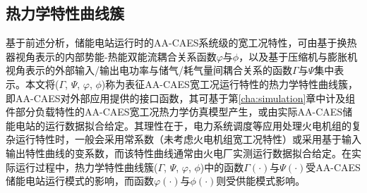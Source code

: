 \subsection{热力学特性曲线簇}
基于前述分析，储能电站运行时的AA-CAES系统级的宽工况特性，可由基于换热器视角表示的内部势能-热能双能流耦合关系函数$\varphi$与$\phi$，以及基于压缩机与膨胀机视角表示的外部输入/输出电功率与储气/耗气量间耦合关系的函数$\Gamma $与$\Psi$集中表示。本文将($\Gamma$, $\Psi$, $\varphi$, $\phi$)称为表征AA-CAES宽工况运行特性的热力学特性曲线簇，即AA-CAES对外部应用提供的接口函数，其可基于第\ref{cha:simulation}章中计及组件部分负载特性的AA-CAES宽工况热力学仿真模型产生，或由实际AA-CAES储能电站的运行数据拟合给定。其理性在于，电力系统调度等应用处理火电机组的复杂运行特性时，一般会采用常系数（未考虑火电机组宽工况特性）或采用基于输入输出特性曲线的变系数，而该特性曲线通常由火电厂实测运行数据拟合给定。在实际运行过程中，热力学特性曲线簇($\Gamma$, $\Psi$, $\varphi$, $\phi$)中的函数$\Gamma(\cdot)$与$\Psi(\cdot)$受AA-CAES储能电站运行模式的影响，而函数$\varphi(\cdot)$与$\phi(\cdot)$则受供能模式影响。



